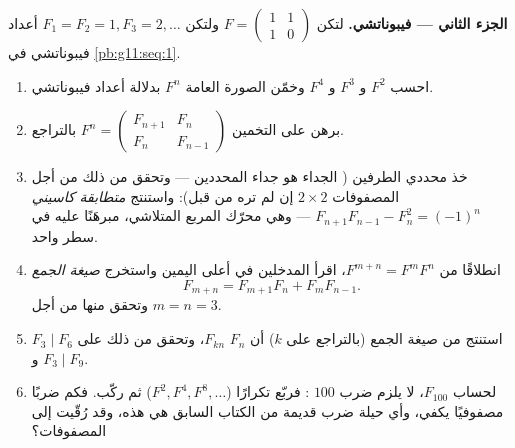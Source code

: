 \begin{problem}
\medskip
\noindent\textbf{الجزء الثاني ---  فيبوناتشي.}
لتكن $F = \begin{pmatrix} 1 & 1\\ 1 & 0\end{pmatrix}$ ولتكن
$F_1 = F_2 = 1, F_3 = 2, \dots$ أعداد فيبوناتشي في
\cref{pb:g11:seq:1}.
\begin{enumerate}[resume]
  \item احسب $F^2$ و $F^3$ و $F^4$ وخمّن الصورة العامة
         $F^n$ بدلالة أعداد فيبوناتشي.
  \item برهن على التخمين
        $F^n = \begin{pmatrix} F_{n+1} & F_n\\ F_n & F_{n-1}
        \end{pmatrix}$ بالتراجع.
  \item خذ محددي الطرفين ( الجداء هو
        جداء المحددين --- وتحقق من ذلك
        من أجل المصفوفات $2 \times 2$ إن لم تره من قبل):
        واستنتج \emph{متطابقة كاسيني}
        $F_{n+1}F_{n-1} - F_n^2 = (-1)^n$ ---
        وهي محرّك المربع المتلاشي، مبرهَنًا عليه في سطر واحد.
  \item انطلاقًا من $F^{m+n} = F^m F^n$، اقرأ المدخلين
        في أعلى اليمين واستخرج \emph{صيغة الجمع}
        \[
        F_{m+n} = F_{m+1} F_n + F_m F_{n-1} .
        \]
        وتحقق منها من أجل $m = n = 3$.
  \item استنتج من صيغة الجمع (بالتراجع على $k$)
        أن $F_n$  $F_{kn}$، وتحقق من ذلك على
        $F_3 \mid F_6$ و $F_3 \mid F_9$.
  \item لحساب $F_{100}$، لا يلزم ضرب $100$
        : فربّع تكرارًا ($F^2, F^4, F^8, \dots$)
        ثم ركّب. فكم ضربًا مصفوفيًا يكفي،
        وأي حيلة ضرب قديمة من الكتاب السابق
        هي هذه، وقد رُقّيت إلى المصفوفات؟
\end{enumerate}


\end{problem}
